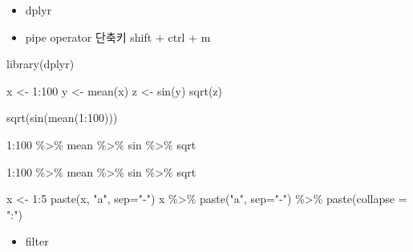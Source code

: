 \documentclass[
]{book}
\newenvironment{Shaded}{\begin{snugshade}}{\end{snugshade}}
\newcommand{\AttributeTok}[1]{\textcolor[rgb]{0.77,0.63,0.00}{#1}}
\newcommand{\DecValTok}[1]{\textcolor[rgb]{0.00,0.00,0.81}{#1}}
\newcommand{\FunctionTok}[1]{\textcolor[rgb]{0.00,0.00,0.00}{#1}}
\newcommand{\NormalTok}[1]{#1}
\newcommand{\OtherTok}[1]{\textcolor[rgb]{0.56,0.35,0.01}{#1}}
\newcommand{\SpecialCharTok}[1]{\textcolor[rgb]{0.00,0.00,0.00}{#1}}
\newcommand{\StringTok}[1]{\textcolor[rgb]{0.31,0.60,0.02}{#1}}
\providecommand{\tightlist}{%
  \setlength{\itemsep}{0pt}\setlength{\parskip}{0pt}}
\begin{document}
\begin{itemize}
\tightlist
\item
  dplyr
\item
  pipe operator 단축키 shift + ctrl + m
\end{itemize}

\begin{Shaded}
\begin{Highlighting}[]
\FunctionTok{library}\NormalTok{(dplyr)}

\NormalTok{x }\OtherTok{\textless{}{-}} \DecValTok{1}\SpecialCharTok{:}\DecValTok{100}
\NormalTok{y }\OtherTok{\textless{}{-}} \FunctionTok{mean}\NormalTok{(x)}
\NormalTok{z }\OtherTok{\textless{}{-}} \FunctionTok{sin}\NormalTok{(y)}
\FunctionTok{sqrt}\NormalTok{(z)}

\FunctionTok{sqrt}\NormalTok{(}\FunctionTok{sin}\NormalTok{(}\FunctionTok{mean}\NormalTok{(}\DecValTok{1}\SpecialCharTok{:}\DecValTok{100}\NormalTok{)))}

\DecValTok{1}\SpecialCharTok{:}\DecValTok{100} \SpecialCharTok{\%\textgreater{}\%}\NormalTok{ mean }\SpecialCharTok{\%\textgreater{}\%}\NormalTok{ sin }\SpecialCharTok{\%\textgreater{}\%}\NormalTok{ sqrt}

\DecValTok{1}\SpecialCharTok{:}\DecValTok{100} \SpecialCharTok{\%\textgreater{}\%} 
\NormalTok{  mean }\SpecialCharTok{\%\textgreater{}\%} 
\NormalTok{  sin }\SpecialCharTok{\%\textgreater{}\%} 
\NormalTok{  sqrt}


\NormalTok{x }\OtherTok{\textless{}{-}} \DecValTok{1}\SpecialCharTok{:}\DecValTok{5}
\FunctionTok{paste}\NormalTok{(x, }\StringTok{"a"}\NormalTok{, }\AttributeTok{sep=}\StringTok{"{-}"}\NormalTok{)}
\NormalTok{x }\SpecialCharTok{\%\textgreater{}\%} 
  \FunctionTok{paste}\NormalTok{(}\StringTok{"a"}\NormalTok{, }\AttributeTok{sep=}\StringTok{"{-}"}\NormalTok{) }\SpecialCharTok{\%\textgreater{}\%} 
  \FunctionTok{paste}\NormalTok{(}\AttributeTok{collapse =} \StringTok{":"}\NormalTok{)}
\end{Highlighting}
\end{Shaded}

\begin{itemize}
\tightlist
\item
  filter
\end{itemize}
\end{document}
